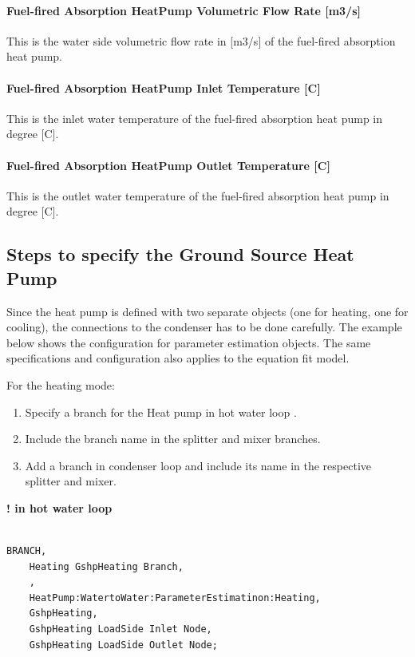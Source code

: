 \paragraph{Fuel-fired Absorption HeatPump Volumetric Flow Rate [m3/s]}
This is the water side volumetric flow rate in [m3/s] of the fuel-fired absorption heat pump.

\paragraph{Fuel-fired Absorption HeatPump Inlet Temperature [C]}
This is the inlet water temperature of the fuel-fired absorption heat pump in degree [C].

\paragraph{Fuel-fired Absorption HeatPump Outlet Temperature [C]}
This is the outlet water temperature of the fuel-fired absorption heat pump in degree [C].

\subsection{Steps to specify the Ground Source Heat Pump}\label{steps-to-specify-the-ground-source-heat-pump}

Since the heat pump is defined with two separate objects (one for heating, one for cooling), the connections to the condenser has to be done carefully. The example below shows the configuration for parameter estimation objects. The same specifications and configuration also applies to the equation fit model.

For the heating mode:

\begin{enumerate}
    \def\labelenumi{\arabic{enumi}.}
    \item
    Specify a branch for the Heat pump in hot water loop .
    \item
    Include the branch name in the splitter and mixer branches.
    \item
    Add a branch in condenser loop and include its name in the respective splitter and mixer.
\end{enumerate}

\textbf{! in hot water loop}

\begin{lstlisting}

BRANCH,
	Heating GshpHeating Branch,
    ,
    HeatPump:WatertoWater:ParameterEstimatinon:Heating,
    GshpHeating,
    GshpHeating LoadSide Inlet Node,
    GshpHeating LoadSide Outlet Node;
\end{lstlisting}


